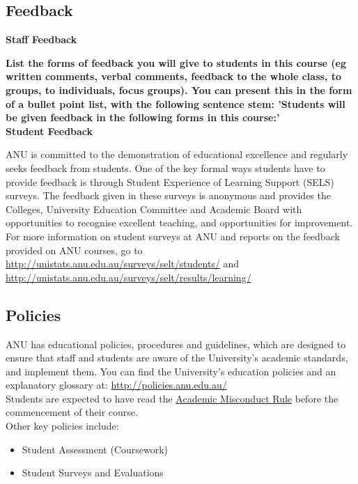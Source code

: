 \documentclass[11pt]{article}
\begin{document}
\subsection*{Feedback}
\textbf{Staff Feedback}

{\bfseries\color{red}List the forms of feedback you will give to students in this course (eg written comments, verbal comments, feedback to the whole class, to groups, to individuals, focus groups). You can present this in the form of a bullet point list, with the following sentence stem: 'Students will be given feedback in the following forms in this course:'} \\

\textbf{Student Feedback}

ANU is committed to the demonstration of educational excellence and regularly seeks feedback from students. One of the key formal ways students have to provide feedback is through Student Experience of Learning Support (SELS) surveys. The feedback given in these surveys is anonymous and provides the Colleges, University Education Committee and Academic Board with opportunities to recognise excellent teaching, and opportunities for improvement. \\

For more information on student surveys at ANU and reports on the feedback provided on ANU courses, go to \\
\hphantom{ null } \url{http://unistats.anu.edu.au/surveys/selt/students/} and \\ 
\hphantom{ null } \url{http://unistats.anu.edu.au/surveys/selt/results/learning/}

\subsection*{Policies}
ANU has educational policies, procedures and guidelines, which are designed to ensure that staff and students are aware of the University’s academic standards, and implement them. You can find the University’s education policies and an explanatory glossary at: \url{http://policies.anu.edu.au/} \\

Students are expected to have read the \href{[http://www.anu.edu.au/about/governance/legislation]}{\color{blue} Academic Misconduct Rule} before the commencement of their course. \\

\qquad Other key policies include:

\begin{itemize}
	\item Student Assessment (Coursework)
	\item Student Surveys and Evaluations
\end{itemize}
\end{document}
